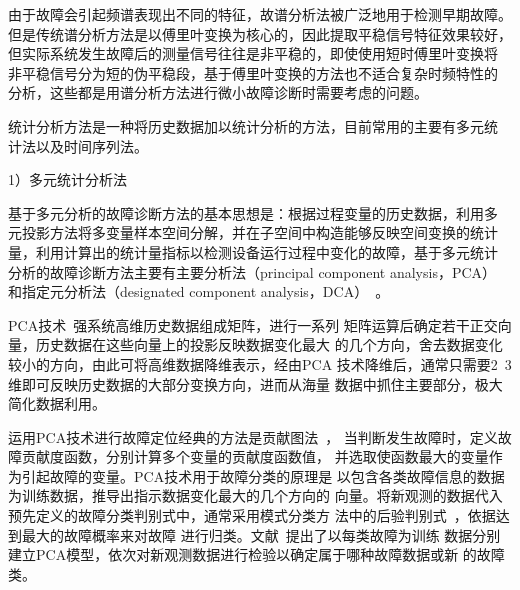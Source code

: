 由于故障会引起频谱表现出不同的特征，故谱分析法被广泛地用于检测早期故障。
但是传统谱分析方法是以傅里叶变换为核心的，因此提取平稳信号特征效果较好，
但实际系统发生故障后的测量信号往往是非平稳的，即使使用短时傅里叶变换将
非平稳信号分为短的伪平稳段，基于傅里叶变换的方法也不适合复杂时频特性的
分析，这些都是用谱分析方法进行微小故障诊断时需要考虑的问题。

统计分析方法是一种将历史数据加以统计分析的方法，目前常用的主要有多元统
计法以及时间序列法。

1）多元统计分析法

基于多元分析的故障诊断方法的基本思想是：根据过程变量的历史数据，利用多
元投影方法将多变量样本空间分解，并在子空间中构造能够反映空间变换的统计
量，利用计算出的统计量指标以检测设备运行过程中变化的故障，基于多元统计
分析的故障诊断方法主要有主要分析法（principal component analysis，PCA）~\cite{zhao2008line}
和指定元分析法（designated component analysis，DCA）~\cite{zhou2008dca}。

PCA技术~\cite{abdi2010principal}强系统高维历史数据组成矩阵，进行一系列
矩阵运算后确定若干正交向量，历史数据在这些向量上的投影反映数据变化最大
的几个方向，舍去数据变化较小的方向，由此可将高维数据降维表示，经由PCA
技术降维后，通常只需要2~3维即可反映历史数据的大部分变换方向，进而从海量
数据中抓住主要部分，极大简化数据利用。

运用PCA技术进行故障定位经典的方法是贡献图法~\cite{miller1998contribution}，
当判断发生故障时，定义故障贡献度函数，分别计算多个变量的贡献度函数值，
并选取使函数最大的变量作为引起故障的变量。PCA技术用于故障分类的原理是
以包含各类故障信息的数据为训练数据，推导出指示数据变化最大的几个方向的
向量。将新观测的数据代入预先定义的故障分类判别式中，通常采用模式分类方
法中的后验判别式~\cite{duda2000pattern}，依据达到最大的故障概率来对故障
进行归类。文献~提出了以每类故障为训练
数据分别建立PCA模型，依次对新观测数据进行检验以确定属于哪种故障数据或新
的故障类。


